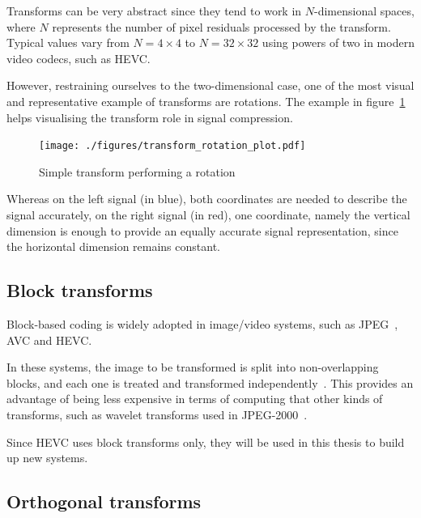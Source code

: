 \documentclass[11pt,a4paper,openright,twoside]{book}
\numberwithin{equation}{section} %
\numberwithin{figure}{section} %
\numberwithin{table}{section} %
\begin{document}
Transforms can be very abstract since they tend to work in $N$-dimensional
spaces, where $N$ represents the number of pixel residuals processed by the
transform.
Typical values vary from $N=4\times4$ to $N=32\times32$ using powers of two in
modern video codecs, such as \ac{HEVC}.

However, restraining ourselves to the two-dimensional case, one of the most
visual and representative example of transforms are rotations.
The example in figure~\ref{fig:transform_rotation} helps visualising the
transform role in signal compression.

\begin{figure}[tb]
	\centering
	\texttt{[image: ./figures/transform\_rotation\_plot.pdf]}
	\caption{Simple transform performing a rotation}
	\label{fig:transform_rotation}
\end{figure}

Whereas on the left signal (in blue), both coordinates are needed to describe
the signal accurately, on the right signal (in red), one coordinate, namely
the vertical dimension is enough to provide an equally accurate signal
representation, since the horizontal dimension remains constant.

\subsection{Block transforms}
\label{sub:block_transforms}

Block-based coding is widely adopted in image/video systems, such as
\acs{JPEG}~\cite{jpeg}, \ac{AVC} and \ac{HEVC}.

In these systems, the image to be transformed is split into non-overlapping
blocks, and each one is treated and transformed
independently~\cite{xu-09-intra-predictive-transforms}.
This provides an advantage of being less expensive in terms of computing that
other kinds of transforms, such as wavelet transforms used in
\acs{JPEG}-2000~\cite{jpeg2000}.

Since \ac{HEVC} uses block transforms only, they will be used in this thesis
to build up new systems.

\subsection{Orthogonal transforms}
\label{sub:orthogonal_transforms}
\end{document}
